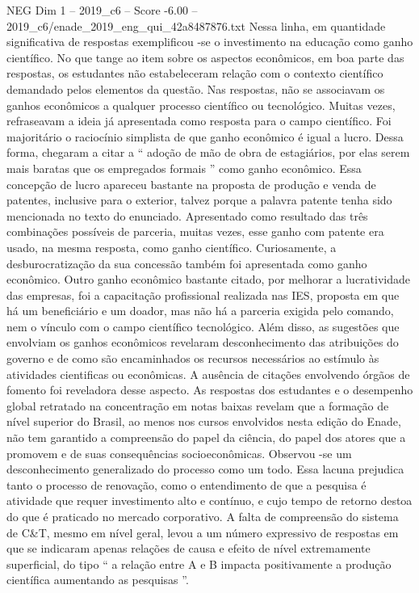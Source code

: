 \begin{textsample}{NEG Dim 1 – 2019\_c6 – Score -6.00 – 2019\_c6/enade\_2019\_eng\_qui\_42a8487876.txt}
Nessa linha, em quantidade significativa de respostas exemplificou -se o investimento na educação como ganho científico.
No que tange ao item sobre os aspectos econômicos, em boa parte das respostas, os estudantes não estabeleceram relação com o contexto científico demandado pelos elementos da questão.
Nas respostas, não se associavam os ganhos econômicos a qualquer processo científico ou tecnológico.
Muitas vezes, refraseavam a ideia já apresentada como resposta para o campo científico.
Foi majoritário o raciocínio simplista de que ganho econômico é igual a lucro.
Dessa forma, chegaram a citar a “ adoção de mão de obra de estagiários, por elas serem mais baratas que os empregados formais ” como ganho econômico.
Essa concepção de lucro apareceu bastante na proposta de produção e venda de patentes, inclusive para o exterior, talvez porque a palavra patente tenha sido mencionada no texto do enunciado.
Apresentado como resultado das três combinações possíveis de parceria, muitas vezes, esse ganho com patente era usado, na mesma resposta, como ganho científico.
Curiosamente, a desburocratização da sua concessão também foi apresentada como ganho econômico.
Outro ganho econômico bastante citado, por melhorar a lucratividade das empresas, foi a capacitação profissional realizada nas IES, proposta em que há um beneficiário e um doador, mas não há a parceria exigida pelo comando, nem o vínculo com o campo científico tecnológico.
Além disso, as sugestões que envolviam os ganhos econômicos revelaram desconhecimento das atribuições do governo e de como são encaminhados os recursos necessários ao estímulo às atividades cientificas ou econômicas.
A ausência de citações envolvendo órgãos de fomento foi reveladora desse aspecto.
As respostas dos estudantes e o desempenho global retratado na concentração em notas baixas revelam que a formação de nível superior do Brasil, ao menos nos cursos envolvidos nesta edição do Enade, não tem garantido a compreensão do papel da ciência, do papel dos atores que a promovem e de suas consequências socioeconômicas.
Observou -se um desconhecimento generalizado do processo como um todo.
Essa lacuna prejudica tanto o processo de renovação, como o entendimento de que a pesquisa é atividade que requer investimento alto e contínuo, e cujo tempo de retorno destoa do que é praticado no mercado corporativo.
A falta de compreensão do sistema de C\&T, mesmo em nível geral, levou a um número expressivo de respostas em que se indicaram apenas relações de causa e efeito de nível extremamente superficial, do tipo “ a relação entre A e B impacta positivamente a produção científica aumentando as pesquisas ”.

\end{textsample}
